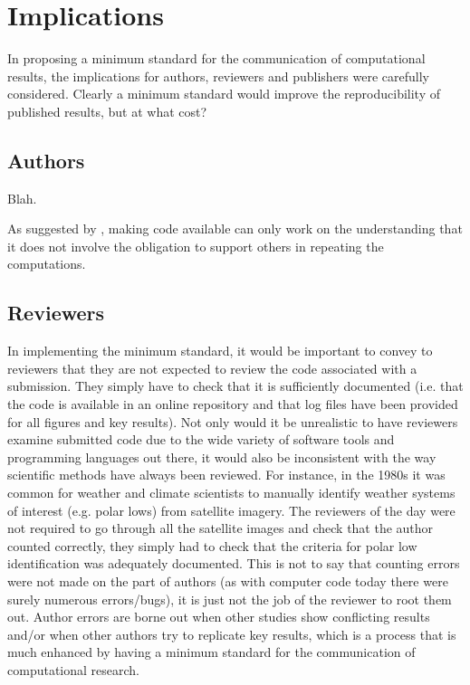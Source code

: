 \section{Implications}

In proposing a minimum standard for the communication of computational results, the implications for authors, reviewers and publishers were carefully considered. Clearly a minimum standard would improve the reproducibility of published results, but at what cost?

\subsection{Authors}

Blah.

As suggested by \citet{Easterbrook2014}, making code available can only work on the understanding that it does not involve the obligation to support others in repeating the computations.

\subsection{Reviewers}

In implementing the minimum standard, it would be important to convey to reviewers that they are not expected to review the code associated with a submission. They simply have to check that it is sufficiently documented (i.e. that the code is available in an online repository and that log files have been provided for all figures and key results). Not only would it be unrealistic to have reviewers examine submitted code due to the wide variety of software tools and programming languages out there, it would also be inconsistent with the way scientific methods have always been reviewed. For instance, in the 1980s it was common for weather and climate scientists to manually identify weather systems of interest (e.g. polar lows) from satellite imagery. The reviewers of the day were not required to go through all the satellite images and check that the author counted correctly, they simply had to check that the criteria for polar low identification was adequately documented. This is not to say that counting errors were not made on the part of authors (as with computer code today there were surely numerous errors/bugs), it is just not the job of the reviewer to root them out. Author errors are borne out when other studies show conflicting results and/or when other authors try to replicate key results, which is a process that is much enhanced by having a minimum standard for the communication of computational research.
